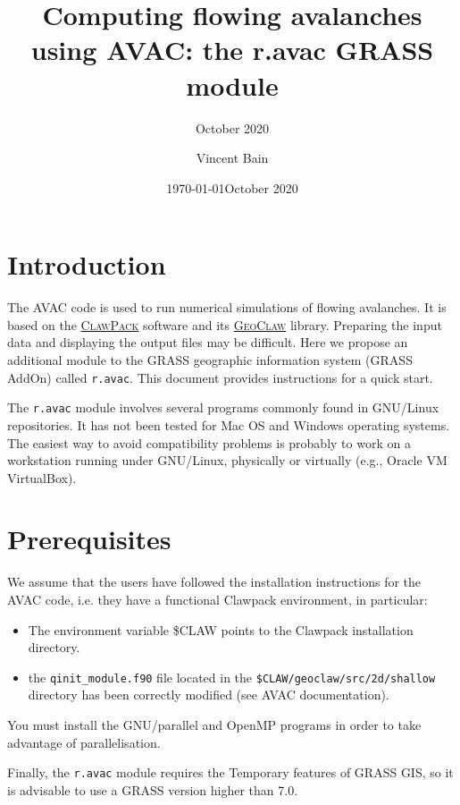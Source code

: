 \documentclass[12pt,oneside]{paper}
\newcommand{\bei}{\begin{itemize}}
\newcommand{\eit}{\end{itemize}}
\begin{document}
\english 
\pagestyle{fancy}
\title{Computing flowing avalanches using AVAC: the r.avac  GRASS module}
\subtitle{October 2020}
\date{\today}
\author[1]{Vincent Bain}
\date{October 2020}

\maketitle
\section{Introduction}

The AVAC code is used to run numerical simulations of flowing avalanches. It is based on the \href{https://www.clawpack.org/}{\textsc{ClawPack}} software and its \href{https://www.clawpack.org/geoclaw.html}{\textsc{GeoClaw}} library. Preparing the input data and displaying the output files may be difficult. Here we propose an additional module to the GRASS geographic information system (GRASS AddOn) called \verb+r.avac+. This document provides instructions for a quick start.

The \verb+r.avac+ module involves several programs commonly found in GNU/Linux repositories. It has not been tested for Mac OS and Windows operating systems. The easiest way to avoid compatibility problems is probably to work on a workstation running under GNU/Linux, physically or virtually (e.g., Oracle VM VirtualBox).



\section{Prerequisites}

We assume that the users have followed the installation instructions for the AVAC code, i.e. they have a functional Clawpack environment, in particular:
\bei
\item The environment variable \$CLAW points to the Clawpack installation directory.
\item the \texttt{qinit\_module.f90} file located in the \texttt{\$CLAW/geoclaw/src/2d/shallow} directory has been correctly modified (see AVAC documentation).
\eit

You must install the GNU/parallel and OpenMP programs in order to take advantage of parallelisation.

Finally, the \verb+r.avac+ module requires the Temporary features of GRASS GIS, so it is advisable to use a GRASS version higher than 7.0.
\end{document}
